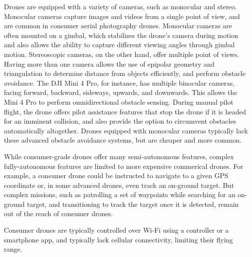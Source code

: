 Drones are equipped with a variety of cameras, such as monocular and stereo.
Monocular cameras capture images and videos from a single point of view, and
are common in consumer aerial photography drones. Monocular cameras are often
mounted on a gimbal, which stabilizes the drone's camera during motion and also
allows the ability to capture different viewing angles through gimbal motion.
Stereoscopic cameras, on the other hand, offer multiple point of views. Having
more than one camera allows the use of epipolar geometry and triangulation to
determine distance from objects efficiently, and perform obstacle avoidance.
The DJI Mini 4 Pro, for instance, has multiple binocular cameras, facing
forward, backward, sideways, upwards, and downwards. This allows the Mini 4 Pro
to perform omnidirectional obstacle sensing. During manual pilot flight, the
drone offers pilot assistance features that stop the drone if it is headed for
an imminent collision, and also provide the option to circumvent obstacles
automatically altogether. Drones equipped with monocular cameras typically lack
these advanced obstacle avoidance systems, but are cheaper and more common.

While consumer-grade drones offer many semi-autonomous features, complex
fully-autonomous features are limited to more expensive commerical drones.  For
example, a consumer drone could be instructed to navigate to a given GPS
coordinate or, in some advanced drones, even track an on-ground target. But
complex missions, such as patrolling a set of waypoints while searching for an
on-ground target, and transitioning to track the target once it is detected,
remain out of the reach of consumer drones.

Consumer drones are typically controlled over Wi-Fi using a controller or a
smartphone app, and typically lack cellular connectivity, limiting their
flying range.


